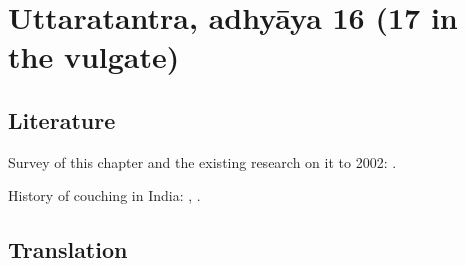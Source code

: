 \section{Uttaratantra, adhyāya 16 (17 in the vulgate)}

\subsection{Literature}

Survey of this chapter and the existing research 
on it to 2002: \cites[IA, 305--306]{meul-hist}.

History of couching in India: \cite{wujad-2019,
    desh-2000,
    desh-1999,
    bret-1826,
    leff-2020,
    shas-kaly,
    jack-1884,
    scot-1817,
    elli-1918,
    hend-1895,
}, \cite[65--67]{wuja-root3}.


\subsection{Translation}

